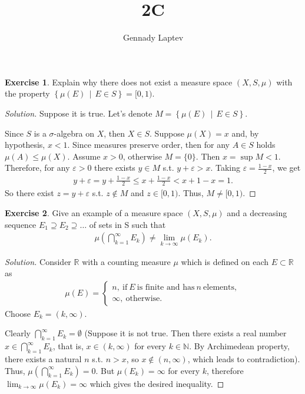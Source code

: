\documentclass[letterpaper, 12pt, english]{article}
\title{2C}
\author{Gennady Laptev}
\date{}
\theoremstyle{definition}
\theoremstyle{definition}
\newtheorem{problem}{Exercise}
\theoremstyle{definition}
\newenvironment{sol}{\begin{proof}[Solution]}{\end{proof}}
\theoremstyle{plain} %
\theoremstyle{plain} %
\theoremstyle{plain} %
\theoremstyle{plain} %
\theoremstyle{remark}
\begin{document}
\maketitle
\setcounter{section}{0}


\setcounter{problem}{0}
\begin{problem}
Explain why there does not exist a measure space $ (X, S, \mu) $ with the property
$ \left\{ \mu(E) \,\middle|\, E \in S \right\} = [0,1) $.
\begin{sol}
    Suppose it is true. Let's denote $ M =  \left\{ \mu(E) \,\middle|\, E \in S \right\}$.

    Since $ S $ is a $ \sigma $-algebra on $ X $, then $ X \in S $. 
    Suppose $ \mu(X) = x $ and, by hypothesis, $ x < 1 $.
    Since measures preserve order, then for any $ A \in S $ 
    holds $ \mu(A) \leq \mu(X) $.
    Assume $ x > 0 $, otherwise 
    $ M = \{ 0 \} $.
    Then $  x = \sup M < 1$.
    Therefore, for any $ \varepsilon > 0 $ there exists $ y \in M $ 
    s.t. $ y + \varepsilon > x $. Taking $ \varepsilon = \frac{1 - x}{2} $,
    we get
    \begin{gather*}
        y + \varepsilon = y + \frac{1 - x}{2} \leq x + \frac{1 - x}{2} 
        < x + 1 - x = 1.
    \end{gather*}
    So there exist $ z = y + \varepsilon $ s.t. $ z \not \in M $ and $ z \in [0, 1) $.
    Thus, $ M \ne [0,1) $.
\end{sol}
\end{problem}



\setcounter{problem}{9}
\begin{problem}
Give an example of a measure space $ (X, S, \mu ) $ and a decreasing sequence
$ E_{1} \supseteq E_{2} \supseteq \ldots $ of sets in S such that 
\begin{gather*}
    \mu \left( \bigcap_{k=1}^{ \infty} E_{k} \right) \ne \lim_{k \to \infty} \mu(E_{k}).
\end{gather*}
\begin{sol}
   Consider $ \mathbb{R} $ with a counting measure $ \mu $ which is
   defined on each $ E \subset \mathbb{R} $ as
   \begin{gather*}
       \mu(E) = 
      \begin{cases}
          n, ~\textrm{if}~ E ~\textrm{is finite and has}~n ~\textrm{elements}, \\ 
          \infty, ~\textrm{otherwise}.
      \end{cases}
   \end{gather*}
   Choose $ E_k = (k, \infty)$.

   Clearly $ \bigcap_{k=1}^{ \infty} E_{k} = \emptyset $ (Suppose it is not true.
   Then there exists a real number $ x \in \bigcap_{k=1}^{ \infty} E_{k} $,
   that is, $ x \in (k, \infty) $ for every $ k \in \mathbb{N} $.
   By Archimedean property, there exists a natural $ n $ s.t. $ n > x $, 
   so $ x \not \in (n, \infty) $, which leads to contradiction). Thus, 
   $ \mu \left( \bigcap_{k=1}^{ \infty} E_{k} \right) = 0 $. 
   But $ \mu(E_k) = \infty $ for every $ k $, therefore
   $ \lim_{k \to \infty} \mu(E_{k}) = \infty $  which gives the desired inequality.
\end{sol}
\end{problem}
 
\end{document}
